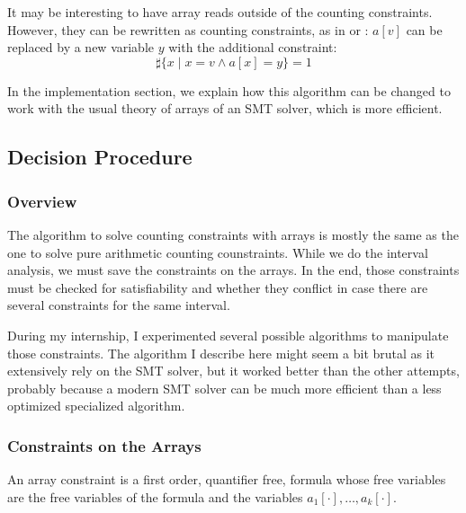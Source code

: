 \documentclass[]{article}
\begin{document}
{It may be interesting to have array reads outside of the counting
constraints. However, they can be rewritten as counting constraints, as in
\cite{bradley2006s} or
\cite{AlbertiGP16}: $a[v]$ can be replaced by a new variable $y$ with the additional constraint:
\begin{equation}
\sharp\{x\mid x = v \land a[x] = y\} = 1
\end{equation}

In the implementation section, we explain
how this algorithm can be changed to work with the usual theory of arrays of an
SMT solver, which is more efficient.

\subsection{Decision Procedure}

\subsubsection{Overview}

The algorithm to solve counting constraints with arrays is mostly the
same as the one to solve pure arithmetic counting counstraints. While we do the interval analysis,
we must save the constraints on the arrays. In the end, those constraints must be checked for
satisfiability and whether they conflict in case there are several constraints for the same interval.

During my internship, I experimented several possible algorithms to
manipulate those constraints. The algorithm I describe here might seem a
bit brutal as it extensively rely on the SMT solver, but it
worked better than the other attempts, probably because a modern SMT
solver can be much more efficient than a less optimized specialized
algorithm.

\subsubsection{Constraints on the Arrays}

\begin{definition}

An array constraint is a first order, quantifier free, formula whose
free variables are the free variables of the formula and the variables
$a_1[\cdot], \ldots, a_k[\cdot]$.

\label{array}

\end{definition}


}
\end{document}

